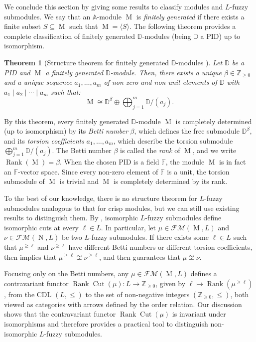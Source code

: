 \documentclass[a4paper,10pt]{article}
\newtheorem{theorem}{Theorem}[section]
\newcommand{\bba}{\mathbb{A}}
\newcommand{\bbd}{\mathbb{D}}
\newcommand{\bbf}{\mathbb{F}}
\newcommand{\bbz}{\mathbb{Z}}
\newcommand{\calfm}{\mathcal{F\!M}}
\DeclareMathOperator{\rank}{Rank}
\DeclareMathOperator{\cut}{Cut}
\DeclareMathOperator{\Mo}{M}
\DeclareMathOperator{\No}{N}
\begin{document}
We conclude this section by giving some results to classify modules and \(L\)-fuzzy submodules. We say that an \(\bba\)-module \(\Mo\) is \emph{finitely generated} if there exists a finite subset \(S \subseteq \Mo\) such that \(\Mo = \langle S \rangle\). The following theorem provides a complete classification of finitely generated \(\bbd\)-modules (being \(\bbd\) a PID) up to isomorphism.

\begin{theorem}[Structure theorem for finitely generated \(\bbd\)-modules \cite{dummit2004chapter12}] 
\label{thm:modules_structure}
Let \(\bbd\) be a PID and \(\Mo\) a finitely generated \(\bbd\)-module. Then, there exists 
a unique \(\beta \in \bbz_{\geq0}\) and 
a unique sequence $a_1,\ldots,a_m$ of non-zero and non-unit elements of $\bbd$ with \(a_1 \mid a_2 \mid \cdots \mid a_m\) such that:
\[
\Mo \cong \bbd^{\beta} \oplus \bigoplus_{j=1}^m\bbd/(a_j).
\]
\end{theorem}

By this theorem, every finitely generated \(\bbd\)-module \(\Mo\) is completely determined (up to isomorphism) by its \emph{Betti number} \(\beta\), which defines the free submodule \(\bbd^{\beta}\), and its \emph{torsion coefficients} \(a_1,\ldots,a_m\), which describe the torsion submodule \(\bigoplus_{j=1}^m \bbd/(a_j)\).
The Betti number \(\beta\) is called the \emph{rank} of \(\Mo\), and we write \(\rank(\Mo) = \beta\).
When the chosen PID is a field \(\bbf\), the module \(\Mo\) is in fact an \(\bbf\)-vector space. Since every non-zero element of \(\bbf\) is a unit, the torsion submodule of \(\Mo\) is trivial and \(\Mo\) is completely determined by its rank.

To the best of our knowledge, there is no structure theorem for \(L\)-fuzzy submodules analogous to that for crisp modules, but we can still use existing results to distinguish them. By , isomorphic \(L\)-fuzzy submodules define isomorphic cuts at every \(\ell \in L\). In particular, let \(\mu \in \calfm(\Mo,L)\) and \(\nu \in \calfm(\No,L)\) be two \(L\)-fuzzy submodules. If there exists some \(\ell \in L\) such that \(\mu^{\ge \ell}\) and \(\nu^{\ge \ell}\) have different Betti numbers or different torsion coefficients, then  implies that \(\mu^{\ge \ell} \not\cong \nu^{\ge \ell}\), and  then guarantees that \(\mu \not\cong \nu\). 

Focusing only on the Betti numbers, any \(\mu \in \calfm(\Mo,L)\) defines a contravariant functor \(\rank\!\cut(\mu): L \to \bbz_{\ge 0}\), given by \(\ell \mapsto \rank(\mu^{\ge \ell})\), from the CDL \((L,\leq)\) to the set of non-negative integers \((\bbz_{\ge 0},\le)\), both viewed as categories with arrows defined by the order relation. Our discussion shows that the contravariant functor \(\rank\!\cut(\mu)\) is invariant under isomorphisms and therefore provides a practical tool to distinguish non-isomorphic \(L\)-fuzzy submodules.
\end{document}
